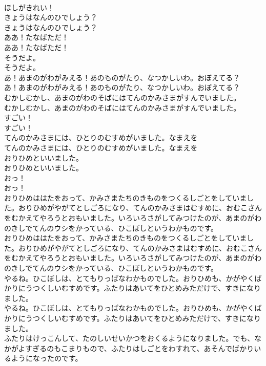 \documentclass[8pt]{extreport}
\begin{document}
\begin{CJK}{UTF8}{min}
\\	ほしがきれい！
\\	きょうはなんのひでしょう？
\\	きょうはなんのひでしょう？
\\	ああ！たなばただ！
\\	ああ！たなばただ！
\\	そうだよ。
\\	そうだよ。
\\	あ！あまのがわがみえる！あのものがたり、なつかしいわ。おぼえてる？
\\	あ！あまのがわがみえる！あのものがたり、なつかしいわ。おぼえてる？
\\	むかしむかし、あまのがわのそばにはてんのかみさまがすんでいました。
\\	むかしむかし、あまのがわのそばにはてんのかみさまがすんでいました。
\\	すごい！
\\	すごい！
\\	てんのかみさまには、ひとりのむすめがいました。なまえを
\\	てんのかみさまには、ひとりのむすめがいました。なまえを
\\	おりひめといいました。
\\	おりひめといいました。
\\	おっ！
\\	おっ！
\\	おりひめははたをおって、かみさまたちのきものをつくるしごとをしていました。おりひめがやがてとしごろになり、てんのかみさまはむすめに、おむこさんをむかえてやろうとおもいました。いろいろさがしてみつけたのが、あまのがわのきしでてんのウシをかっている、ひこぼしというわかものです。
\\	おりひめははたをおって、かみさまたちのきものをつくるしごとをしていました。おりひめがやがてとしごろになり、てんのかみさまはむすめに、おむこさんをむかえてやろうとおもいました。いろいろさがしてみつけたのが、あまのがわのきしでてんのウシをかっている、ひこぼしというわかものです。
\\	やるね。ひこぼしは、とてもりっぱなわかものでした。おりひめも、かがやくばかりにうつくしいむすめです。ふたりはあいてをひとめみただけで、すきになりました。
\\	やるね。ひこぼしは、とてもりっぱなわかものでした。おりひめも、かがやくばかりにうつくしいむすめです。ふたりはあいてをひとめみただけで、すきになりました。
\\	ふたりはけっこんして、たのしいせいかつをおくるようになりました。でも、なかがよすぎるのもこまりもので、ふたりはしごとをわすれて、あそんでばかりいるようになったのです。

\end{CJK}
\end{document}
